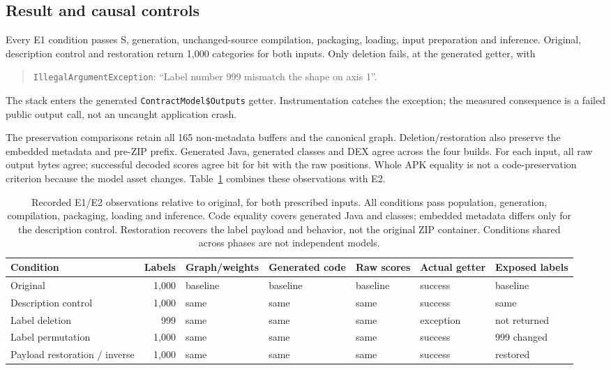\documentclass[10pt,conference]{IEEEtran}
\newcommand{\code}[1]{\texttt{#1}}
\begin{document}
\subsection{Result and causal controls}
Every E1 condition passes S, generation, unchanged-source compilation, packaging, loading, input preparation and inference. Original, description control and restoration return 1,000 categories for both inputs. Only deletion fails, at the generated getter, with
\begin{quote}\small\raggedright
\code{IllegalArgumentException}: ``Label number 999 mismatch the shape on axis 1''.
\end{quote}
The stack enters the generated \code{ContractModel\$Outputs} getter. Instrumentation catches the exception; the measured consequence is a failed public output call, not an uncaught application crash.

The preservation comparisons retain all 165 non-metadata buffers and the canonical graph. Deletion/restoration also preserve the embedded metadata and pre-ZIP prefix. Generated Java, generated classes and DEX agree across the four builds. For each input, all raw output bytes agree; successful decoded scores agree bit for bit with the raw positions. Whole APK equality is not a code-preservation criterion because the model asset changes. Table~\ref{tab:core} combines these observations with E2.

\begin{table}[t]
\caption{Recorded E1/E2 observations relative to original, for both prescribed inputs. All conditions pass population, generation, compilation, packaging, loading and inference. Code equality covers generated Java and classes; embedded metadata differs only for the description control. Restoration recovers the label payload and behavior, not the original ZIP container. Conditions shared across phases are not independent models.}
\label{tab:core}
\centering\small
\setlength{\tabcolsep}{5pt}
\begin{tabular}{@{}lrlllll@{}}
\toprule
Condition & Labels & Graph/weights & Generated code & Raw scores & Actual getter & Exposed labels\\
\midrule
Original & 1,000 & baseline & baseline & baseline & success & baseline\\
Description control & 1,000 & same & same & same & success & same\\
Label deletion & 999 & same & same & same & exception & not returned\\
Label permutation & 1,000 & same & same & same & success & 999 changed\\
Payload restoration / inverse & 1,000 & same & same & same & success & restored\\
\bottomrule
\end{tabular}
\end{table}
\end{document}
